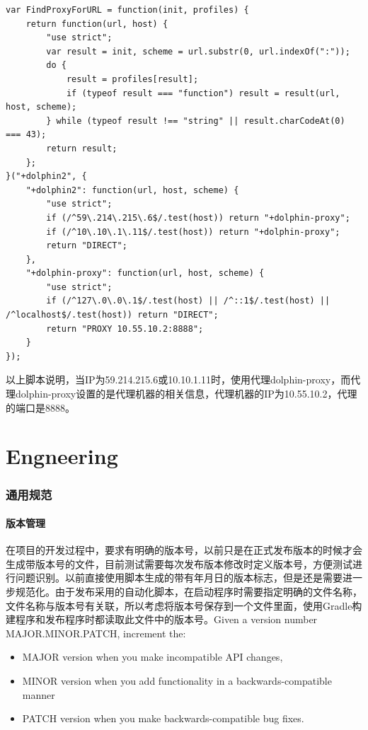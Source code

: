 \documentclass[letter]{book}
\begin{document}
\begin{lstlisting}[language=VBScript]
var FindProxyForURL = function(init, profiles) {
	return function(url, host) {
		"use strict";
		var result = init, scheme = url.substr(0, url.indexOf(":"));
		do {
			result = profiles[result];
			if (typeof result === "function") result = result(url, host, scheme);
		} while (typeof result !== "string" || result.charCodeAt(0) === 43);
		return result;
	};
}("+dolphin2", {
	"+dolphin2": function(url, host, scheme) {
		"use strict";
		if (/^59\.214\.215\.6$/.test(host)) return "+dolphin-proxy";
		if (/^10\.10\.1\.11$/.test(host)) return "+dolphin-proxy";
		return "DIRECT";
	},
	"+dolphin-proxy": function(url, host, scheme) {
		"use strict";
		if (/^127\.0\.0\.1$/.test(host) || /^::1$/.test(host) || /^localhost$/.test(host)) return "DIRECT";
		return "PROXY 10.55.10.2:8888";
	}
});
\end{lstlisting}

以上脚本说明，当IP为59.214.215.6或10.10.1.11时，使用代理dolphin-proxy，而代理dolphin-proxy设置的是代理机器的相关信息，代理机器的IP为10.55.10.2，代理的端口是8888。

\part{Engneering}

\section{通用规范}

\subsection{版本管理}

在项目的开发过程中，要求有明确的版本号，以前只是在正式发布版本的时候才会生成带版本号的文件，目前测试需要每次发布版本修改时定义版本号，方便测试进行问题识别。以前直接使用脚本生成的带有年月日的版本标志，但是还是需要进一步规范化。由于发布采用的自动化脚本，在启动程序时需要指定明确的文件名称，文件名称与版本号有关联，所以考虑将版本号保存到一个文件里面，使用Gradle构建程序和发布程序时都读取此文件中的版本号。Given a version number MAJOR.MINOR.PATCH, increment the:

\begin{itemize}
	\item{MAJOR version when you make incompatible API changes,}
    \item{MINOR version when you add functionality in a backwards-compatible manner}
	\item{PATCH version when you make backwards-compatible bug fixes.}
\end{itemize}
\end{document}
